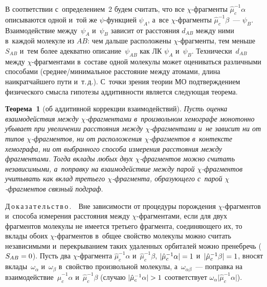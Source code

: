 \begin{multicols}{2}
     В соответствии с~определением~2 будем считать, что все  
$\chi$-фраг\-мен\-ты $\hat{\mu}_c^{-1}\alpha$ описываются одной и~той же 
$\psi$-функ\-ци\-ей $\psi_{{A}}$, а~все $\chi$-фраг\-мен\-ты 
$\hat{\mu}_c^{-1}\beta$~--- $\psi_{{B}}$. Взаимодействие 
между~$\psi_{{A}}$ и~$\psi_{{B}}$ зависит от расстояния 
$d_{{AB}}$ между ними в~каждой молекуле из $AB$: чем 
дальше расположены $\chi$-фраг\-мен\-ты, тем 
меньше~${S}_{{AB}}$ и~тем более адекватно 
описание~$\psi_{{AB}}$ как ЛК $\psi_{{A}}$ 
и~$\psi_{{B}}$. Технически~$d_{{AB}}$ между  
$\chi$-фраг\-мен\-та\-ми в~составе одной молекулы может оцениваться 
различными способами  
(сред\-нее/ми\-ни\-маль\-ное расстояние между атомами, длина наикратчайшего 
пути и~т.\,д.).     С~точки зрения теории МО подтверждением физического 
смысла гипотезы аддитивности является сле\-ду\-ющая тео\-рема.


\smallskip

\noindent
\textbf{Теорема~1} (об аддитивной коррекции взаимодействий). \textit{Пусть 
оценка взаимодействия между \mbox{$\chi$-фраг}\-мен\-та\-ми в~произвольном 
хемографе монотонно убывает при увеличении расстояния между  
$\chi$-фраг\-мен\-та\-ми и~не зависит ни от типов $\chi$-фраг\-мен\-тов, ни 
от расположения  
$\chi$-фраг\-мен\-тов в~контексте хемографа, ни от выбранного способа 
измерения расстояния между фрагментами. Тогда вклады любых двух  
$\chi$-фраг\-мен\-тов можно считать независимыми, а~поправку на 
взаимодействие между парой $\chi$-фраг\-мен\-тов учитывать как вклад 
третьего $\chi$-фраг\-мен\-та, образующего с~парой  
$\chi$-фраг\-мен\-тов связный подграф}.

\smallskip


\noindent
    Д\,о\,к\,а\,з\,а\,т\,е\,л\,ь\,с\,т\,в\,о\,.\ \ Вне зависимости от процедуры 
порождения  
$\chi$-фраг\-мен\-тов и~способа измерения расстояния между  
$\chi$-фраг\-мен\-та\-ми, если для двух фрагментов молекулы не имеется 
третьего фрагмента, соединяющего их, то вклады обоих $\chi$-фраг\-мен\-тов 
в~общее свойство молекулы можно считать независимыми и~перекрыванием 
таких удаленных орбиталей можно пренебречь 
(${S}_{AB}\hm=0$). Пусть два  
$\chi$-фраг\-мен\-та $\hat{\mu}_c^{-1}\alpha$ и~$\hat{\mu}_c^{-1}\beta$, $\vert 
\hat{\mu}_c^{-1}\alpha\vert\hm=1$ и~$\vert \hat{\mu}_c^{-1}\beta\vert\hm=1$, 
вносят вклады~$\omega_\alpha$ и~$\omega_\beta$ в~свойство произвольной 
молекулы, а~$\omega_{\alpha\beta}$~--- поправка на 
взаимодействие~$\hat{\mu}_c^{-1}\alpha$ и~$\hat{\mu}_c^{-1}\beta$ (случаю 
$\vert \hat{\mu}_c^{-1}\alpha\vert\hm>1$ соответствует $\omega_\alpha\vert 
\hat{\mu}_c^{-1}\alpha\vert$).
     

\end{multicols}
